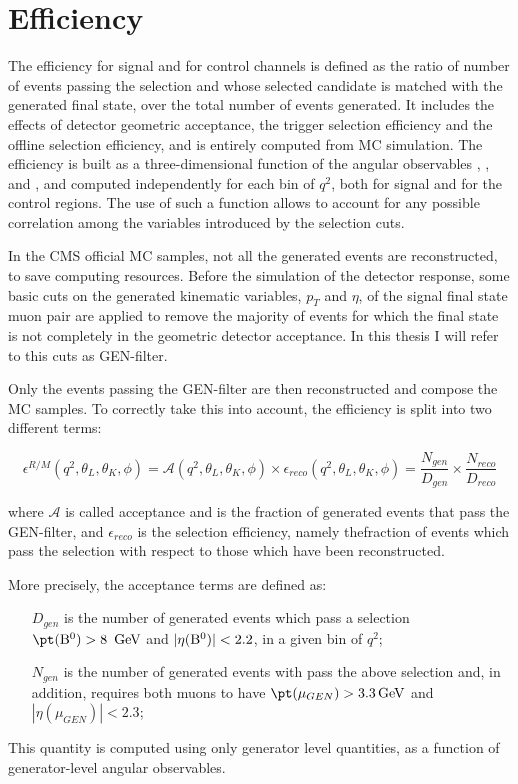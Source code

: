 \section{Efficiency}\label{sec:eff}

The efficiency for signal and for control channels is defined as the ratio of number of events passing the selection and whose selected candidate is matched with the generated final state, over the total number of events generated.
It includes the effects of detector geometric acceptance, the trigger selection efficiency and the offline selection efficiency, and is entirely computed from MC simulation.
The efficiency is built as a three-dimensional function of the angular observables \TL, \TK, and \PHI, and computed independently for each bin of $q^2$, both for signal and for the control regions.
The use of such a function allows to account for any possible correlation among the variables introduced by the selection cuts.

In the CMS official MC samples, not all the generated events are reconstructed, to save computing resources. Before the simulation of the detector response, some basic cuts on the generated kinematic variables, $p_T$ and $\eta$, of the signal final state muon pair are applied to remove the majority of events for which the final state is not completely in the geometric detector acceptance. In this thesis I will refer to this cuts as GEN-filter.

Only the events passing the GEN-filter are then reconstructed and compose the MC samples. To correctly take this into account, the efficiency is split into two different terms: 

\begin{equation}\label{eq:eff}
    \epsilon^{R/M}(q^2,\theta_L,\theta_K,\phi)=\mathcal{A}(q^2,\theta_L,\theta_K,\phi)\times\epsilon_{reco}(q^2,\theta_L,\theta_K,\phi)= \frac{N_{gen}}{D_{gen}}\times\frac{N_{reco}}{D_{reco}}
\end{equation}

where $\mathcal{A}$ is called acceptance and is the fraction of generated events that pass the GEN-filter, and $\epsilon_{reco}$ is the selection efficiency, namely thefraction of events which pass the selection with respect to those which have been reconstructed.

More precisely, the acceptance terms are defined as:
\begin{itemize}
    \item[$D_{gen}$] is the number of generated events which pass a selection $\pt(\PBz)>8~\GeV$ and $|\eta({\textrm{B}}{}^{0})|<2.2$, in a given bin of $q^2$;
    \item[$N_{gen}$] is the number of generated events with pass the above selection and, in addition, requires both muons to have $\pt(\mu_{GEN})>3.3\GeV$ and $|\eta(\mu_{GEN})|<2.3$;
\end{itemize}
This quantity is computed using only generator level quantities, as a function of generator-level angular observables. %

